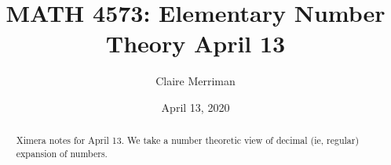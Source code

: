 \documentclass{xourse}
\title{MATH 4573: Elementary Number Theory April 13}
\author{Claire Merriman}
\date{April 13, 2020}
\begin{document}
  
\begin{abstract} %
Ximera notes for April 13. We take a number theoretic view of decimal (ie, regular) expansion of numbers.
\end{abstract}  
\maketitle 
 
 
\end{document}
